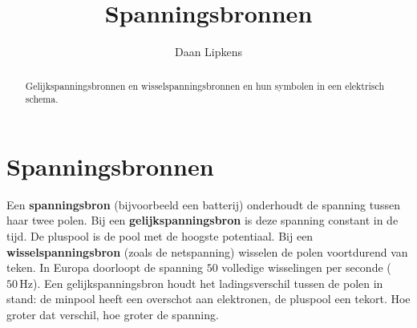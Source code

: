 \documentclass{ximera}
\title{Spanningsbronnen}
\author{Daan Lipkens}
\begin{document}
\begin{abstract}
    Gelijkspanningsbronnen en wisselspanningsbronnen en hun symbolen in een elektrisch schema.
\end{abstract}
\maketitle
\label{app:spanningsbronnen}

\section{Spanningsbronnen}\label{sec:spanningsbronnen}
Een \textbf{spanningsbron} (bijvoorbeeld een batterij) onderhoudt de spanning tussen haar twee polen. Bij een \textbf{gelijkspanningsbron} is deze spanning constant in de tijd. De pluspool is de pool met de hoogste potentiaal. Bij een \textbf{wisselspanningsbron} (zoals de netspanning) wisselen de polen voortdurend van teken. In Europa doorloopt de spanning $50$ volledige wisselingen per seconde ($50 \, \mathrm{Hz}$). Een gelijkspanningsbron houdt het ladingsverschil tussen de polen in stand: de minpool heeft een overschot aan elektronen, de pluspool een tekort. Hoe groter dat verschil, hoe groter de spanning.
\end{document}
